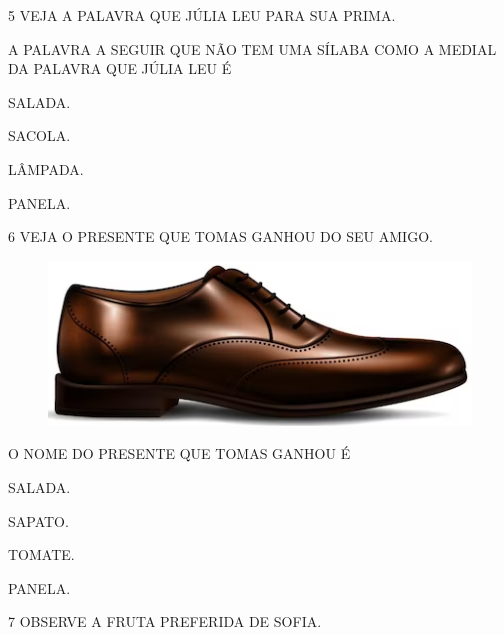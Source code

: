 \vspace{0.5cm}

\num{5} VEJA A PALAVRA QUE JÚLIA LEU PARA SUA PRIMA.

\begin{myquote}
\end{myquote}

A PALAVRA A SEGUIR QUE NÃO TEM UMA SÍLABA COMO A MEDIAL
DA PALAVRA QUE JÚLIA LEU É

\begin{multicols}{2}
\begin{escolha}%
\item SALADA.

\item SACOLA.

\item LÂMPADA.

\item PANELA.
\end{escolha}
\end{multicols}

\pagebreak
\num{6} VEJA O PRESENTE QUE TOMAS GANHOU DO SEU AMIGO.

\begin{figure}[H]
\centering
\includegraphics[width=.5\textwidth]{media/image191.png}
\end{figure}

O NOME DO PRESENTE QUE TOMAS GANHOU É

\begin{multicols}{2}
\begin{escolha}%
\item SALADA.

\item SAPATO.

\item TOMATE.

\item PANELA.
\end{escolha}
\end{multicols}

\vspace{0.3cm}

\num{7} OBSERVE A FRUTA PREFERIDA DE SOFIA.

